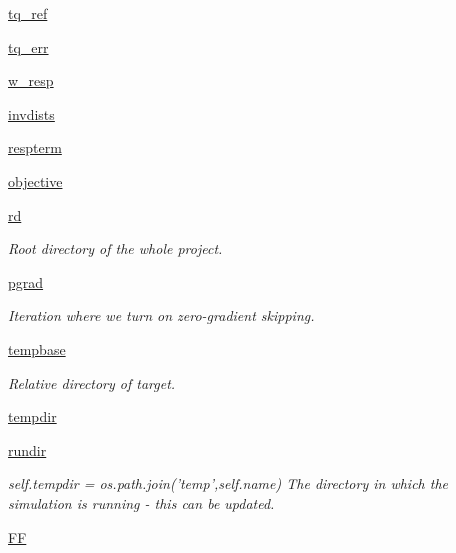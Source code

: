 \begin{DoxyCompactItemize}
\hyperlink{classforcebalance_1_1abinitio_1_1AbInitio_aadda7244869b583a4533317615c421e1}{tq\-\_\-ref}
\item 
\hyperlink{classforcebalance_1_1abinitio_1_1AbInitio_ae60e834d5b5bf13f8fb70d403a97db28}{tq\-\_\-err}
\item 
\hyperlink{classforcebalance_1_1abinitio_1_1AbInitio_a176a442bd340d2f9b54319e76feb46ae}{w\-\_\-resp}
\item 
\hyperlink{classforcebalance_1_1abinitio_1_1AbInitio_aa01ee600ba0f429ffc81135af9d8109b}{invdists}
\item 
\hyperlink{classforcebalance_1_1abinitio_1_1AbInitio_a689e3849518b33539442a473a41ed32d}{respterm}
\item 
\hyperlink{classforcebalance_1_1abinitio_1_1AbInitio_acbbd447b9f66bc4699992f3b64bb256d}{objective}
\item 
\hyperlink{classforcebalance_1_1target_1_1Target_a4edb69fbde792e9f2f27e54b7c978c8e}{rd}
\begin{DoxyCompactList}\small\item\em Root directory of the whole project. \end{DoxyCompactList}\item 
\hyperlink{classforcebalance_1_1target_1_1Target_a684235b4332b608c4e2da22982c2fdfa}{pgrad}
\begin{DoxyCompactList}\small\item\em Iteration where we turn on zero-\/gradient skipping. \end{DoxyCompactList}\item 
\hyperlink{classforcebalance_1_1target_1_1Target_ae5b544d3e11365865813ef3d626ef81d}{tempbase}
\begin{DoxyCompactList}\small\item\em Relative directory of target. \end{DoxyCompactList}\item 
\hyperlink{classforcebalance_1_1target_1_1Target_aa1f01b5b78db253b5b66384ed11ed193}{tempdir}
\item 
\hyperlink{classforcebalance_1_1target_1_1Target_a6872de5b2d4273b82336ea5b0da29c9e}{rundir}
\begin{DoxyCompactList}\small\item\em self.\-tempdir = os.\-path.\-join('temp',self.\-name) The directory in which the simulation is running -\/ this can be updated. \end{DoxyCompactList}\item 
\hyperlink{classforcebalance_1_1target_1_1Target_a38a37919783141ea37fdcf8b00ce0aaf}{F\-F}

\end{DoxyCompactItemize}
